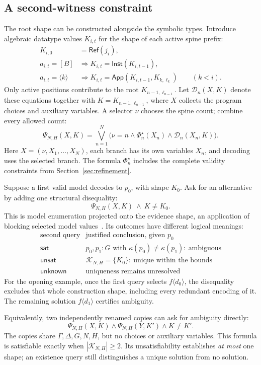 \documentclass[10pt,a4paper]{article}
\newcommand{\iarg}[1]{\langle#1\rangle}
\newcommand{\kw}[1]{\mathsf{#1}}
\begin{document}
\subsection{A second-witness constraint}
\label{sec:ambiguity-query}
The root shape can be constructed alongside the symbolic types. Introduce
algebraic datatype values $K_{i,t}$ for the shape of each active spine prefix:
\[
\begin{aligned}
 K_{i,0}&=\kw{Ref}(j_i),\\
 a_{i,t}=[B]&\Longrightarrow
   K_{i,t}=\kw{Inst}(K_{i,t-1}),\\
 a_{i,t}=\iarg{k}&\Longrightarrow
   K_{i,t}=\kw{App}(K_{i,t-1},K_{k,\ell_k})\qquad(k<i).
\end{aligned}
\]
Only active positions contribute to the root $K_{n-1,\ell_{n-1}}$.
Let $\mathcal D_n(X,K)$ denote these equations together with
$K=K_{n-1,\ell_{n-1}}$, where $X$ collects the program choices and auxiliary
variables. A selector $\nu$ chooses the spine count; combine every allowed count:
\[
 \Psi_{N,H}(X,K)
   =\bigvee_{n=1}^{N}
       \bigl(\nu=n\land\Phi_n^\star(X_n)\land\mathcal D_n(X_n,K)\bigr).
\]
Here $X=(\nu,X_1,\ldots,X_N)$, each branch has its own variables $X_n$, and
decoding uses the selected branch. The formula $\Phi_n^\star$ includes the
complete validity constraints from Section~\ref{sec:refinement}.

Suppose a first valid model decodes to $p_0$, with shape $K_0$.
Ask for an alternative by adding one structural disequality:
\[
 \boxed{\Psi_{N,H}(X,K)\ \land\ K\ne K_0.}
\]
This is model enumeration projected onto the evidence shape, an application of
blocking selected model values~\cite{programming-smt}. Its outcomes have different
logical meanings:
\[
\begin{array}{c|l}
 \text{second query} & \text{justified conclusion, given }p_0\\ \hline
 \mathsf{sat} & p_0,p_1:G\text{ with }\kappa(p_0)\ne\kappa(p_1):\ \text{ambiguous}\\
 \mathsf{unsat} & \mathcal K_{N,H}=\{K_0\}:\ \text{unique within the bounds}\\
 \mathsf{unknown} & \text{uniqueness remains unresolved}
\end{array}
\]
For the opening example, once the first query selects $f\iarg{d_0}$, the
disequality excludes that whole construction shape, including every redundant
encoding of it. The remaining solution $f\iarg{d_1}$ certifies ambiguity.

Equivalently, two independently renamed copies can ask for ambiguity directly:
\[
 \boxed{\Psi_{N,H}(X,K)\land\Psi_{N,H}(Y,K')\land K\ne K'.}
\]
The copies share $\Gamma,\Delta,G,N,H$, but no choices or auxiliary variables.
This formula is satisfiable exactly when $|\mathcal K_{N,H}|\ge2$.
Its unsatisfiability establishes \emph{at most} one shape; an existence query
still distinguishes a unique solution from no solution.
\end{document}
